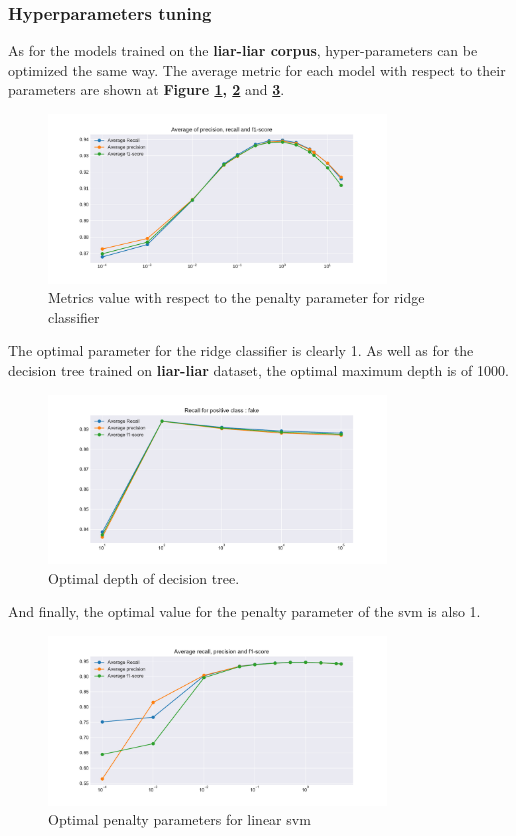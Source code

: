 \subsubsection{Hyperparameters tuning}
As for the models trained on the \textbf{liar-liar corpus}, hyper-parameters can be optimized the same way. The average metric for each model with respect to their parameters are shown at \textbf{Figure \ref{fig:chap3:ridge2}, \ref{fig:chap3:dt2}} and \textbf{\ref{fig:chap3:lsvm2}}. \\
\begin{figure}
 \centering
 \includegraphics[width=0.8\textwidth]{images/chapitre3/ridge}
 \caption{Metrics value with respect to the penalty parameter for ridge classifier}
 \label{fig:chap3:ridge2}
\end{figure}
The optimal parameter for the ridge classifier is clearly 1. As well as for the decision tree trained on \textbf{liar-liar} dataset, the optimal maximum depth is of 1000. 
\begin{figure}
 \centering
 \includegraphics[width=0.8\textwidth]{images/chapitre3/fake-dt}
 \caption{Optimal depth of decision tree.}
 \label{fig:chap3:dt2}
\end{figure}
And finally, the optimal value for the penalty parameter of the svm is also 1.\\
\begin{figure}
 \centering
 \includegraphics[width=0.8\textwidth]{images/chapitre3/svc_fake}
 \caption{Optimal penalty parameters for linear svm}
 \label{fig:chap3:lsvm2}
\end{figure}
